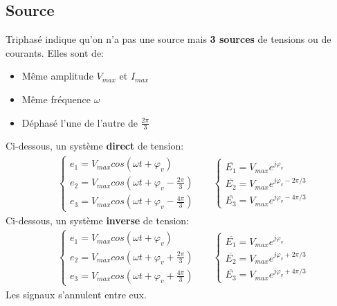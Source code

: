 \documentclass{report}
\begin{document}
\subsection{Source}
Triphasé indique qu'on n'a pas une source mais \textbf{3 sources} de tensions ou de courants. Elles sont de:
\begin{itemize}
\item Même amplitude $V_{max}$ et $I_{max}$
\item Même fréquence $\omega$
\item Déphasé l'une de l'autre de $\frac{2\pi}{3}$
\end{itemize}
Ci-dessous, un système \textbf{direct} de tension:
\begin{align*}
&\begin{cases}
e_1 = V_{max} cos(\omega t + \varphi_v)\\
e_2 = V_{max} cos(\omega t + \varphi_v - \frac{2\pi}{3})\\
e_3 = V_{max} cos(\omega t + \varphi_v - \frac{4 \pi}{3})
\end{cases} & &\begin{cases}
\overline{E_1} = V_{max}e^{j \varphi_v}\\
\overline{E_2} = V_{max}e^{j \varphi_v - 2 \pi /3}\\
\overline{E_3} = V_{max}e^{j \varphi_v - 4 \pi /3}
\end{cases}
\end{align*}
Ci-dessous, un système \textbf{inverse} de tension:
\begin{align*}
&\begin{cases}
e_1 = V_{max} cos(\omega t + \varphi_v)\\
e_2 = V_{max} cos(\omega t + \varphi_v + \frac{2\pi}{3})\\
e_3 = V_{max} cos(\omega t + \varphi_v + \frac{4 \pi}{3})
\end{cases} & &\begin{cases}
\overline{E_1} = V_{max}e^{j \varphi_v}\\
\overline{E_2} = V_{max}e^{j \varphi_v + 2 \pi /3}\\
\overline{E_3} = V_{max}e^{j \varphi_v + 4 \pi /3}
\end{cases}
\end{align*}
Les signaux s'annulent entre eux.
\end{document}
